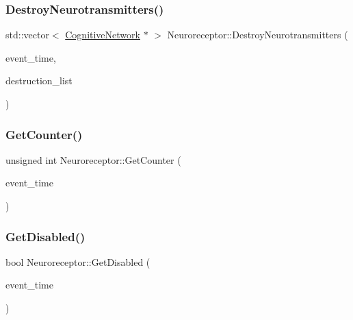 \mbox{\label{classNeuroreceptor_acd500abfb25bd08167b2002e85e8b788}} 
\subsubsection{\texorpdfstring{Destroy\+Neurotransmitters()}{DestroyNeurotransmitters()}}
{\footnotesize\ttfamily std\+::vector$<$ \mbox{\hyperlink{classCognitiveNetwork}{Cognitive\+Network}} $\ast$ $>$ Neuroreceptor\+::\+Destroy\+Neurotransmitters (\begin{DoxyParamCaption}\item[{std\+::chrono\+::time\+\_\+point$<$ \mbox{\hyperlink{universe_8h_a0ef8d951d1ca5ab3cfaf7ab4c7a6fd80}{Clock}} $>$}]{event\+\_\+time,  }\item[{std\+::vector$<$ \mbox{\hyperlink{classCognitiveNetwork}{Cognitive\+Network}} $\ast$$>$}]{destruction\+\_\+list }\end{DoxyParamCaption})}

\mbox{\label{classNeuroreceptor_a4a49cfc2f741d7f7b7888929651f7be3}} 
\subsubsection{\texorpdfstring{Get\+Counter()}{GetCounter()}}
{\footnotesize\ttfamily unsigned int Neuroreceptor\+::\+Get\+Counter (\begin{DoxyParamCaption}\item[{std\+::chrono\+::time\+\_\+point$<$ \mbox{\hyperlink{universe_8h_a0ef8d951d1ca5ab3cfaf7ab4c7a6fd80}{Clock}} $>$}]{event\+\_\+time }\end{DoxyParamCaption})\hspace{0.3cm}{\ttfamily [inline]}}

\mbox{\label{classNeuroreceptor_aff4754990dc5b8d0105db281c02031d7}} 
\subsubsection{\texorpdfstring{Get\+Disabled()}{GetDisabled()}}
{\footnotesize\ttfamily bool Neuroreceptor\+::\+Get\+Disabled (\begin{DoxyParamCaption}\item[{std\+::chrono\+::time\+\_\+point$<$ \mbox{\hyperlink{universe_8h_a0ef8d951d1ca5ab3cfaf7ab4c7a6fd80}{Clock}} $>$}]{event\+\_\+time }\end{DoxyParamCaption})\hspace{0.3cm}{\ttfamily [inline]}}

